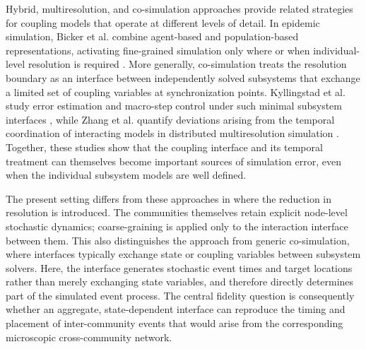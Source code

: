 \documentclass[a4paper,fleqn]{cas-sc}
\begin{document}
Hybrid, multiresolution, and co-simulation approaches provide related strategies for coupling models that operate at different levels of detail. In epidemic simulation, Bicker et al. combine agent-based and population-based representations, activating fine-grained simulation only where or when individual-level resolution is required \cite{bicker2025}. More generally, co-simulation treats the resolution boundary as an interface between independently solved subsystems that exchange a limited set of coupling variables at synchronization points. Kyllingstad et al. study error estimation and macro-step control under such minimal subsystem interfaces \cite{kyllingstad2025}, while Zhang et al. quantify deviations arising from the temporal coordination of interacting models in distributed multiresolution simulation \cite{zhang2024multiresolution}. Together, these studies show that the coupling interface and its temporal treatment can themselves become important sources of simulation error, even when the individual subsystem models are well defined.

The present setting differs from these approaches in where the reduction in resolution is introduced. The communities themselves retain explicit node-level stochastic dynamics; coarse-graining is applied only to the interaction interface between them. This also distinguishes the approach from generic co-simulation, where interfaces typically exchange state or coupling variables between subsystem solvers. Here, the interface generates stochastic event times and target locations rather than merely exchanging state variables, and therefore directly determines part of the simulated event process. The central fidelity question is consequently whether an aggregate, state-dependent interface can reproduce the timing and placement of inter-community events that would arise from the corresponding microscopic cross-community network.
\end{document}
